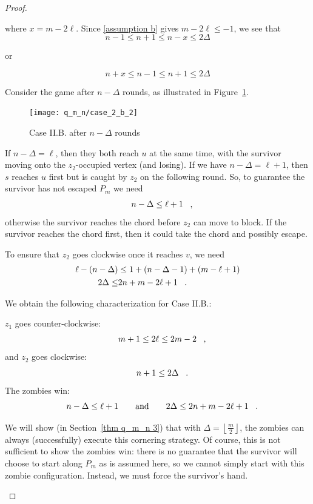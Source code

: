 \begin{proof}
\begin{proofpart}
\begin{itemize}
  where $x = m -2\ell$. Since \ref{assumption b} gives $m - 2\ell \leq -1$, we
  see that
  \[ n-1 \leq n+1 \leq n-x \leq 2 \Delta \]
  \begin{center}or\end{center}
  \[ n+x \leq n-1 \leq n+1 \leq 2 \Delta \]

  Consider the game after $n-\Delta$ rounds, as illustrated in Figure~\ref{fig:case_2_b_2}.
  \begin{figure}
    \centering
    \texttt{[image: q\_m\_n/case\_2\_b\_2]}
    \caption{Case II.B. after $n-\Delta$ rounds \label{fig:case_2_b_2}}
  \end{figure}

  If $n - \Delta = \ell$, then they both reach $u$ at the same time,
  with the survivor moving onto the $z_2$-occupied vertex (and losing).
  If we have $n - \Delta = \ell + 1$, then $s$ reaches $u$ first
  but is caught by $z_2$ on the following round.
  So, to guarantee the survivor has not escaped $P_m$ we need
  \begin{align*}
   n - \Delta &\leq \ell + 1 \mcomma \\
  \end{align*}
  otherwise the survivor reaches the chord before $z_2$ can move
  to block. If the survivor reaches the chord first, then it could
  take the chord and possibly escape.

  To ensure that $z_2$ goes clockwise once it reaches $v$, we need
  \begin{align*}
   \ell - (n - \Delta) &\leq 1 + (n - \Delta - 1) + (m - \ell + 1) \\
   2 \Delta \leq            & 2n + m - 2\ell + 1 \mperiod
  \end{align*}

  We obtain the following characterization for Case II.B.:

  $z_1$ goes counter-clockwise:
  \[ m + 1 \leq 2 \ell \leq 2m - 2 \mcomma \]
  and $z_2$ goes clockwise:
  \[ n+1 \leq 2 \Delta \mperiod\]
  The zombies win:
  \[ n - \Delta \leq \ell + 1 \qquad \text{and} \qquad 2 \Delta \leq 2n + m - 2\ell + 1 \mperiod \]

\end{itemize}

We will show (in Section~\ref{thm q_m_n 3}) that with $\Delta = \left\lfloor \frac{m}{2} \right\rfloor$, the zombies can always (successfully) execute this cornering strategy. Of course, this is not sufficient to show the zombies win: there is no guarantee that the survivor will choose to start along $P_m$ as is assumed here, so we cannot simply start with this zombie configuration. Instead, we must force the survivor's hand.
\end{proofpart}


\end{proof}
